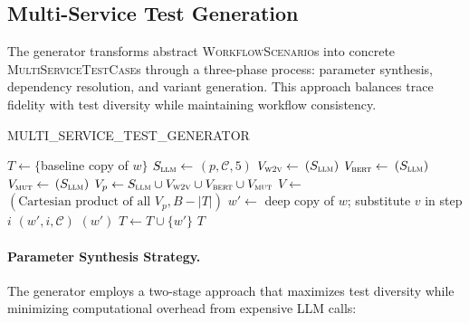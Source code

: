 \subsection{Multi-Service Test Generation}
\label{ssec:gen}

The generator transforms abstract \textsc{WorkflowScenario}s into concrete
\textsc{MultiServiceTestCase}s through a three-phase process: parameter
synthesis, dependency resolution, and variant generation.  This approach
balances trace fidelity with test diversity while maintaining workflow
consistency.

\begin{algorithm}[tb]
\caption{MULTI\_SERVICE\_TEST\_GENERATOR}\label{alg:generate}
\footnotesize
\begin{algorithmic}[1]
\Require{}
\Ensure{}
\State $T \gets \{$baseline copy of $w$$\}$
        \State $S_{\textsc{llm}} \gets$ $(p, \mathcal{C}, 5)$ 
        \State $V_{\textsc{w2v}} \gets$ $(S_{\textsc{llm}})$
        \State $V_{\textsc{bert}} \gets$ $(S_{\textsc{llm}})$
        \State $V_{\textsc{mut}} \gets$ $(S_{\textsc{llm}})$
        \State $V_p \gets S_{\textsc{llm}} \cup V_{\textsc{w2v}} \cup V_{\textsc{bert}} \cup V_{\textsc{mut}}$
    \EndFor
    \State $V \gets$ $(\text{Cartesian product of all } V_p, B-|T|)$
        \State $w' \gets$ deep copy of $w$; substitute $v$ in step $i$
        \State {}$(w', i, \mathcal{C})$
        \State {}$(w')$
        \State $T \gets T \cup \{w'\}$
    \EndFor
\EndFor
\State \Return $T$
\end{algorithmic}
\end{algorithm}

\paragraph{Parameter Synthesis Strategy.}
The generator employs a two-stage approach that maximizes test diversity
while minimizing computational overhead from expensive LLM calls:


